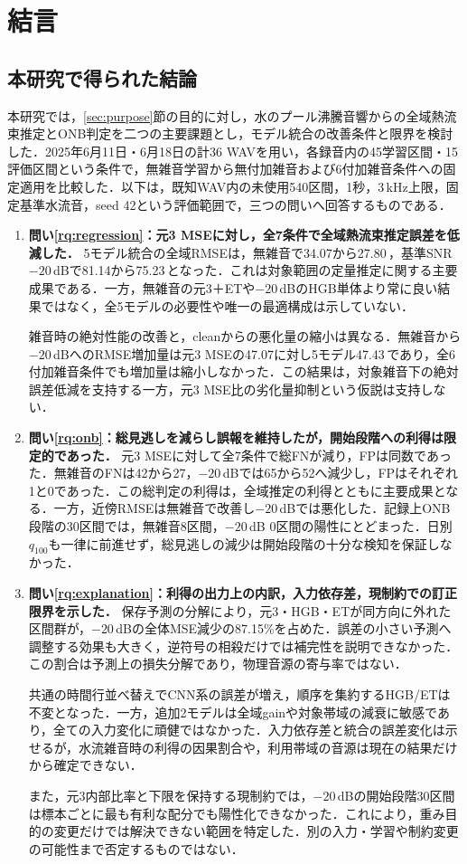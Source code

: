 \chapter{結言}\label{ch:conclusions}
\section{本研究で得られた結論}
本研究では，\ref{sec:purpose}節の目的に対し，水のプール沸騰音響からの全域熱流束推定とONB判定を二つの主要課題とし，モデル統合の改善条件と限界を検討した．2025年6月11日・6月18日の計36 WAVを用い，各録音内の45学習区間・15評価区間という条件で，無雑音学習から無付加雑音および6付加雑音条件への固定適用を比較した．以下は，既知WAV内の未使用540区間，1秒，3\,kHz上限，固定基準水流音，seed 42という評価範囲で，三つの問いへ回答するものである．

\begin{enumerate}
\item \textbf{問い\ref{rq:regression}：元3 MSEに対し，全7条件で全域熱流束推定誤差を低減した．}
5モデル統合の全域RMSEは，無雑音で34.07から27.80\,\kw{}，基準SNR $-20$\,dBで81.14から75.23\,\kw{}となった．これは対象範囲の定量推定に関する主要成果である．一方，無雑音の元3＋ETや$-20$\,dBのHGB単体より常に良い結果ではなく，全5モデルの必要性や唯一の最適構成は示していない．

雑音時の絶対性能の改善と，cleanからの悪化量の縮小は異なる．無雑音から$-20$\,dBへのRMSE増加量は元3 MSEの47.07に対し5モデル47.43\,\kw{}であり，全6付加雑音条件でも増加量は縮小しなかった．この結果は，対象雑音下の絶対誤差低減を支持する一方，元3 MSE比の劣化量抑制という仮説は支持しない．

\item \textbf{問い\ref{rq:onb}：総見逃しを減らし誤報を維持したが，開始段階への利得は限定的であった．}
元3 MSEに対して全7条件で総FNが減り，FPは同数であった．無雑音のFNは42から27，$-20$\,dBでは65から52へ減少し，FPはそれぞれ1と0であった．この総判定の利得は，全域推定の利得とともに主要成果となる．一方，近傍RMSEは無雑音で改善し$-20$\,dBでは悪化した．記録上ONB段階の30区間では，無雑音8区間，$-20$\,dB 0区間の陽性にとどまった．日別$q_{100}$も一律に前進せず，総見逃しの減少は開始段階の十分な検知を保証しなかった．

\item \textbf{問い\ref{rq:explanation}：利得の出力上の内訳，入力依存差，現制約での訂正限界を示した．}
保存予測の分解により，元3・HGB・ETが同方向に外れた区間群が，$-20$\,dBの全体MSE減少の87.15\%を占めた．誤差の小さい予測へ調整する効果も大きく，逆符号の相殺だけでは補完性を説明できなかった．この割合は予測上の損失分解であり，物理音源の寄与率ではない．

共通の時間行並べ替えでCNN系の誤差が増え，順序を集約するHGB/ETは不変となった．一方，追加2モデルは全域gainや対象帯域の減衰に敏感であり，全ての入力変化に頑健ではなかった．入力依存差と統合の誤差変化は示せるが，水流雑音時の利得の因果割合や，利用帯域の音源は現在の結果だけから確定できない．

また，元3内部比率と下限を保持する現制約では，$-20$\,dBの開始段階30区間は標本ごとに最も有利な配分でも陽性化できなかった．これにより，重み目的の変更だけでは解決できない範囲を特定した．別の入力・学習や制約変更の可能性まで否定するものではない．
\end{enumerate}

